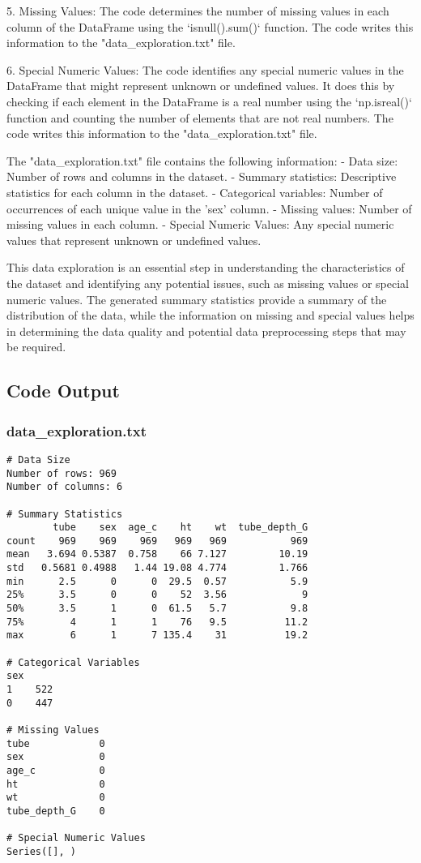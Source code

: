 \documentclass[11pt]{article}
\begin{document}
5. Missing Values: The code determines the number of missing values in each column of the DataFrame using the `isnull().sum()` function. The code writes this information to the "data\_exploration.txt" file.

6. Special Numeric Values: The code identifies any special numeric values in the DataFrame that might represent unknown or undefined values. It does this by checking if each element in the DataFrame is a real number using the `np.isreal()` function and counting the number of elements that are not real numbers. The code writes this information to the "data\_exploration.txt" file.

The "data\_exploration.txt" file contains the following information:
- Data size: Number of rows and columns in the dataset.
- Summary statistics: Descriptive statistics for each column in the dataset.
- Categorical variables: Number of occurrences of each unique value in the 'sex' column.
- Missing values: Number of missing values in each column.
- Special Numeric Values: Any special numeric values that represent unknown or undefined values.

This data exploration is an essential step in understanding the characteristics of the dataset and identifying any potential issues, such as missing values or special numeric values. The generated summary statistics provide a summary of the distribution of the data, while the information on missing and special values helps in determining the data quality and potential data preprocessing steps that may be required.

\subsection{Code Output}

\subsubsection*{data\_exploration.txt}

\begin{Verbatim}[tabsize=4]
# Data Size
Number of rows: 969
Number of columns: 6

# Summary Statistics
        tube    sex  age_c    ht    wt  tube_depth_G
count    969    969    969   969   969           969
mean   3.694 0.5387  0.758    66 7.127         10.19
std   0.5681 0.4988   1.44 19.08 4.774         1.766
min      2.5      0      0  29.5  0.57           5.9
25%      3.5      0      0    52  3.56             9
50%      3.5      1      0  61.5   5.7           9.8
75%        4      1      1    76   9.5          11.2
max        6      1      7 135.4    31          19.2

# Categorical Variables
sex
1    522
0    447

# Missing Values
tube            0
sex             0
age_c           0
ht              0
wt              0
tube_depth_G    0

# Special Numeric Values
Series([], )

\end{Verbatim}
\end{document}
